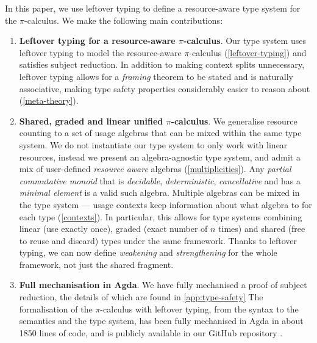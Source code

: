 \documentclass[]{llncs}
\newcommand{\picalc}{$\pi$-calculus}
\begin{document}
In this paper, we use leftover typing to define a resource-aware type system for the \picalc{}.
We make the following main contributions:
\begin{enumerate}
  \item \textbf{Leftover typing for a resource-aware \picalc{}}. Our type system uses leftover typing to model the resource-aware \picalc{} (\autoref{leftover-typing}) and satisfies subject reduction.
    In addition to making context splits unnecessary, leftover typing allows for a \emph{framing} theorem to be stated and is naturally associative, making type safety properties considerably easier to reason about (\autoref{meta-theory}).
        
  \item \textbf{Shared, graded and linear unified \picalc{}}.
  We {generalise resource counting to a set of usage algebras that can be mixed within the same type system}.
    We do not instantiate our type system to only work with linear resources, instead we present an algebra-agnostic type system, and admit a mix of user-defined \emph{resource aware} algebras (\autoref{multiplicities}).
    Any \emph{partial commutative monoid} that is \emph{decidable}, \emph{deterministic}, \emph{cancellative} and has a \emph{minimal element} is a valid such algebra.
    Multiple algebras can be mixed in the type system --- usage contexts keep information about what algebra to for each type (\autoref{contexts}).
    In particular, this allows for type systems combining linear (use exactly once), graded (exact number of $n$ times) and shared (free to reuse and discard) types under the same framework.
    Thanks to leftover typing, we can now define \emph{weakening} and \emph{strengthening} for the whole framework, not just the shared fragment.
    
    \item \textbf{Full mechanisation in Agda}. We have fully mechanised a proof of subject reduction, the details of which are found in \autoref{app:type-safety}
The formalisation of the \picalc{} with leftover typing, from the syntax to the semantics and the type system, has been fully mechanised in Agda in about 1850 lines of code, and is publicly available in our GitHub repository \cite{Zalakain2020Agda}.

\end{enumerate}
\end{document}
